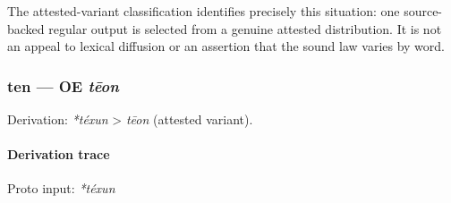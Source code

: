 \documentclass[
  british,
  a4paper,
]{article}
\begin{document}
The attested-variant classification identifies precisely this situation:
one source-backed regular output is selected from a genuine attested
distribution. It is not an appeal to lexical diffusion or an assertion
that the sound law varies by word.

\subsubsection{\texorpdfstring{ten --- OE
\emph{tēon}}{ten --- OE tēon}}\label{ten-oe-tux113on}

Derivation: \emph{*téxun} \textgreater{} \emph{tēon} (attested variant).

\paragraph{Derivation trace}\label{derivation-trace-108}

Proto input: \emph{*téxun}

\begingroup
\setlength{\fboxsep}{6pt}

\noindent{} \endgroup
\end{document}
